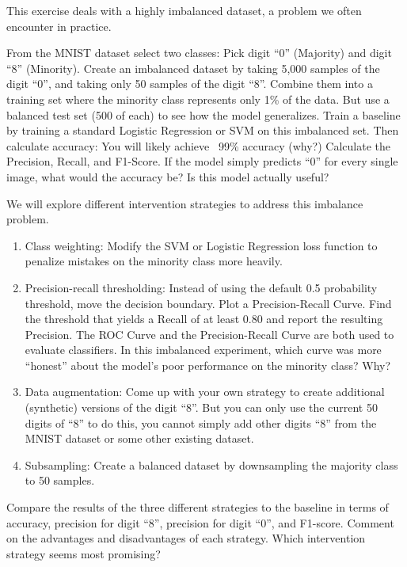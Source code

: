\begin{myexercise} This exercise deals with a highly imbalanced dataset, a problem we often encounter in practice. 


From the MNIST dataset select two classes: Pick digit ``0'' (Majority) and digit ``8'' (Minority). Create an imbalanced dataset by taking 5,000 samples of the digit ``0'', and taking only 50 samples of the digit ``8''.
Combine them into a training set where the minority class represents only 1\% of the data.
But use a balanced test set (500 of each) to see how the model generalizes.
Train a baseline by training a standard Logistic Regression or SVM on this imbalanced set. Then calculate accuracy: You will likely achieve ~99\% accuracy (why?)
Calculate the Precision, Recall, and F1-Score. If the model simply predicts ``0'' for every single image, what would the accuracy be? Is this model actually useful?

We will explore different intervention strategies to address this imbalance problem.

\vspace*{-2mm}
\begin{enumerate}
\item Class weighting:
Modify the SVM or Logistic Regression loss function to penalize mistakes on the minority class more heavily.

\item Precision-recall thresholding:
Instead of using the default 0.5 probability threshold, move the decision boundary.
Plot a Precision-Recall Curve. Find the threshold that yields a Recall of at least 0.80 and report the resulting Precision.
The ROC Curve and the Precision-Recall Curve are both used to evaluate classifiers. In this imbalanced experiment, which curve was more ``honest'' about the model's poor performance on the minority class? Why?

\item Data augmentation: Come up with your own strategy to create additional (synthetic) versions of the digit ``8''. But you can only use the current 50 digits of ``8'' to do this, you cannot simply add other digits ``8'' from the MNIST dataset or some other existing dataset.

\item Subsampling: Create a balanced dataset by downsampling the majority class to 50 samples. 
\end{enumerate}

Compare the results of the three different strategies to the baseline in terms of accuracy, precision for digit ``8'', precision for digit ``0'', and F1-score. Comment on the advantages and disadvantages of each strategy.
Which intervention strategy seems most promising?
    
\end{myexercise}
